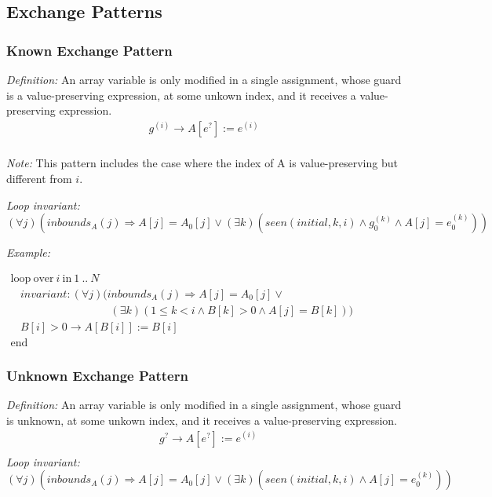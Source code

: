 \documentclass[a4paper,10pt]{article}
\newcommand{\idx}{\ensuremath{i}\xspace}
\newcommand{\idxinitial}{\ensuremath{\mathit{initial}}\xspace}
\newcommand{\at}[1]{{(#1)}}
\newcommand{\KWloop}{\ensuremath{\mathrm{loop}~}}
\newcommand{\KWend}{\ensuremath{\mathrm{end}~}}
\newcommand{\KWover}{\ensuremath{\mathrm{over}~}}
\newcommand{\KWin}{\ensuremath{~\mathrm{in}~}}
\newcommand{\impl}{\ensuremath{\Longrightarrow}}
\newcommand{\inbounds}[2]{\ensuremath{\mathit{inbounds}_{#1}(#2)}\xspace}
\newcommand{\seen}[3]{\ensuremath{\mathit{seen}{(#1,#2,#3)}}\xspace}
\newcommand{\loopinvariant}{\noindent\textit{Loop invariant:}\xspace}
\newcommand{\patterndef}{\noindent\textit{Definition:}\xspace}
\newcommand{\patternexample}{\noindent\textit{Example:}\xspace}
\newcommand{\patternnote}{\noindent\textit{Note:}\xspace}
\begin{document}
\subsection{Exchange Patterns}

\subsubsection*{Known Exchange Pattern}

\patterndef An array variable is only modified in a single assignment,
whose guard is a value-preserving expression, at some unkown index, 
and it receives a value-preserving expression.
%
\begin{eqnarray*}
g^\at{\idx} \rightarrow A[e^?] := e^\at{\idx}\\
\end{eqnarray*}

%
\patternnote This pattern includes the case where the index of A is value-preserving but different from $i$.

\medskip
%
\loopinvariant
%
$$(\forall j)(\inbounds{A}{j} \impl A[j] = A_0[j] \lor (\exists k)(\seen{\idxinitial}{k}{\idx} \land g_0^\at{k} \land A[j] = e_0^\at{k}))$$

\bigskip
\patternexample

\medskip
$\begin{array}{l}
  \KWloop \KWover i \KWin 1~..~N \\
  ~~~~ \textit{invariant}: (\forall j)(\inbounds{A}{j} \impl A[j] = A_0[j] \lor \\ 
  ~~~~~~~~~~~~~~~~~~~~~~~~~~~~~~~~~~~~~~~~~ (\exists k)(1 \leq k < i \land B[k] > 0 \land A[j] = B[k]))\\
  ~~~~ B[i] > 0 \rightarrow A[B[i]] := B[i]\\
  \KWend
\end{array}$

\subsubsection*{Unknown Exchange Pattern}

\patterndef An array variable is only modified in a single assignment,
whose guard is unknown, at some unkown index, and it receives a value-preserving expression.
%
\begin{eqnarray*}
&g^? \rightarrow A[e^?] := e^\at{\idx}\\
\end{eqnarray*}
%
\loopinvariant
%
$$(\forall j)(\inbounds{A}{j} \impl A[j] = A_0[j] \lor (\exists k)(\seen{\idxinitial}{k}{\idx} \land A[j] = e_0^\at{k}))$$
\end{document}
